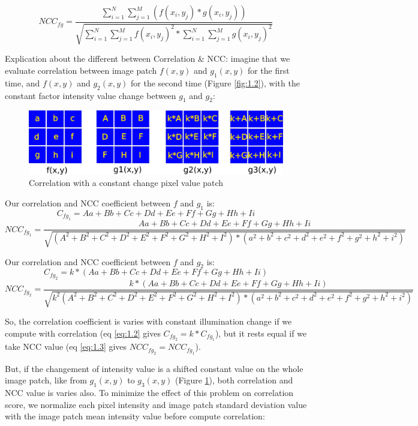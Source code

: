 \documentclass[twoside]{article}
\begin{document}
\begin{equation}
NCC_{fg} = \frac{\sum_{i=1}^{N}\sum_{j=1}^{M}(f(x_i,y_j)*g(x_i,y_j))}
{\sqrt{\sum_{i=1}^{N}\sum_{j=1}^{M}f(x_i,y_j)^2*\sum_{i=1}^{N}\sum_{j=1}^{M}g(x_i,y_j)^2}}
\label{eq:1.3}
\end{equation}

Explication about the different between Correlation \& NCC: imagine that we evaluate correlation between image patch $f(x,y)$ and $g_1(x,y)$ for the first time, and $f(x,y)$ and $g_2(x,y)$ for the second time (Figure \ref{fig:1.2}), with the constant factor intensity value change between $g_1$ and $g_2$:

\begin{figure}[h] 
\centering
\includegraphics[width=13cm]{correl_const_4.png}
\caption{Correlation with a constant change pixel value patch}
\label{fig:1.1}
\end{figure}
Our correlation and NCC coefficient between $f$ and $g_1$ is:
\begin{equation}
C_{fg_1} = Aa+Bb+Cc+Dd+Ee+Ff+Gg+Hh+Ii
\end{equation}
\begin{equation}
NCC_{fg_1} = \frac{Aa+Bb+Cc+Dd+Ee+Ff+Gg+Hh+Ii}
				  {\sqrt{(A^2+B^2+C^2+D^2+E^2+F^2+G^2+H^2+I^2)*(a^2+b^2+c^2+d^2+e^2+f^2+g^2+h^2+i^2)}}
\end{equation}

Our correlation and NCC coefficient between $f$ and $g_2$ is:
\begin{equation}
C_{fg_2} = k*(Aa+Bb+Cc+Dd+Ee+Ff+Gg+Hh+Ii)
\end{equation}
\begin{equation}
NCC_{fg_2} = \frac{k*(Aa+Bb+Cc+Dd+Ee+Ff+Gg+Hh+Ii)}
				  {\sqrt{k^2(A^2+B^2+C^2+D^2+E^2+F^2+G^2+H^2+I^2)*(a^2+b^2+c^2+d^2+e^2+f^2+g^2+h^2+i^2)}}
\end{equation}

So, the correlation coefficient is varies with constant illumination change if we compute with correlation (eq \ref{eq:1.2} gives $C_{fg_2} =k*C_{fg_1}$), but it rests equal if we take NCC value (eq \ref{eq:1.3} gives $NCC_{fg_2} = NCC_{fg_1}$). 

But, if the changement of intensity value is a shifted constant value on the whole image patch, like from $g_1(x,y)$ to $g_3(x,y)$ (Figure \ref{fig:1.1}), both correlation and NCC value is varies also. To minimize the effect of this problem on correlation score, we normalize each pixel intensity and image patch standard deviation value with the image patch mean intensity value before compute correlation:
\end{document}
